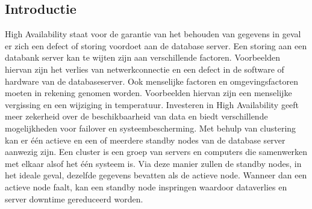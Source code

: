 \documentclass[a0,portrait]{a0poster}
\begin{document}
\begin{multicols}{2} %


\color{HoGentAccent1} %

\begin{abstract}

\end{abstract}

\color{HoGentAccent1} 
\section*{Introductie}
\color{black}
\color{black}
High Availability staat voor de garantie van het behouden van gegevens in geval er zich een defect of storing voordoet aan de database server. Een storing aan een databank server kan te wijten zijn aan verschillende factoren. Voorbeelden hiervan zijn het verlies van netwerkconnectie en een defect in de software of hardware van de databaseserver. Ook menselijke factoren en omgevingsfactoren moeten in rekening genomen worden. Voorbeelden hiervan zijn een menselijke vergissing en een wijziging in temperatuur. Investeren in High Availability geeft meer zekerheid over de beschikbaarheid van data en biedt verschillende mogelijkheden voor failover en systeembescherming. 
Met behulp van clustering kan er één actieve en een of meerdere standby nodes van de database server aanwezig zijn. Een cluster is een groep van servers en computers die samenwerken met elkaar alsof het één systeem is. Via deze manier zullen de standby nodes, in het ideale geval, dezelfde gegevens bevatten als de actieve node. Wanneer dan een actieve node faalt, kan een standby node inspringen waardoor dataverlies en server downtime gereduceerd worden.



\color{Black} %
\color{HoGentAccent1} 

\end{multicols}
\end{document}
